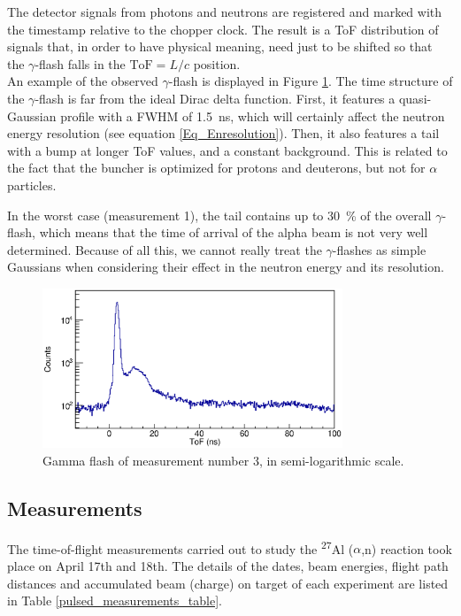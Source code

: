 \documentclass[a4paper,12pt]{report}
\newcommand{\an}{($\alpha$,n) }
\newcommand{\Aliso}{\textsuperscript{27}Al }
\begin{document}
The detector signals from photons and neutrons are registered and marked with the timestamp relative to the chopper clock.
The result is a ToF distribution of signals that, in order to have physical meaning, need just to be shifted so that the $\gamma$-flash falls in the $\text{ToF}=L/c$ position.
\\

An example of the observed $\gamma$-flash is displayed in Figure \ref{example_gflash}.	%
The time structure of the $\gamma$-flash is far from the ideal Dirac delta function.
First, it features a quasi-Gaussian profile with a FWHM of \qty{1.5}{\nano\second}, which will certainly affect the neutron energy resolution (see equation \ref{Eq_Enresolution}).
Then, it also features a tail with a bump at longer ToF values, and a constant background.
This is related to the fact that the buncher is optimized for protons and deuterons, but not for $\alpha$ particles.

In the worst case (measurement 1), the tail contains up to \qty{30}{\percent} of the overall $\gamma$-flash, which means that the time of arrival of the alpha beam is not very well determined.
Because of all this, we cannot really treat the $\gamma$-flashes as simple Gaussians when considering their effect in the neutron energy and its resolution.

\begin{figure}[H]
	\centering
	\includegraphics[width=0.80\textwidth]{example_gflash.eps}
	\caption{Gamma flash of measurement number 3, in semi-logarithmic scale.}
	\label{example_gflash}
\end{figure}

\subsection{Measurements} 
The time-of-flight measurements carried out to study the \Aliso \an reaction took place on April 17th and 18th.
The details of the dates, beam energies, flight path distances and accumulated beam (charge) on target of each experiment are listed in Table \ref{pulsed_measurements_table}.
\end{document}
